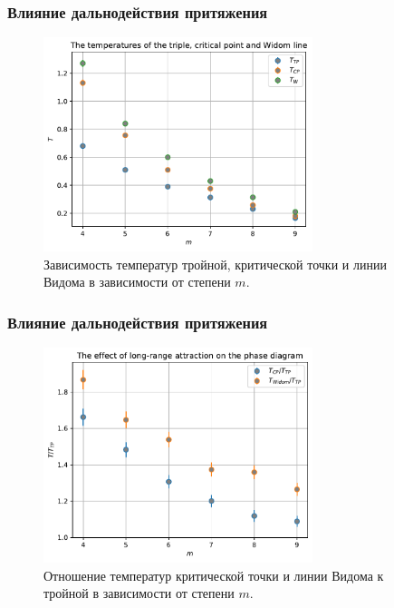 \documentclass[pdf,hyperref={unicode}]{beamer}
\begin{document}
\begin{frame}
\transdissolve[duration=0.2]
\frametitle{Влияние дальнодействия притяжения}

\begin{figure}[h]
\begin{center}
\includegraphics[width=0.7\textwidth]{temperatures_triple_critical_Widom}
\caption{ \small Зависимость температур тройной, критической точки и линии Видома в зависимости от степени $m$.}
\label{risTcpTtp}
\end{center}
\end{figure}

\end{frame}





\begin{frame}
\transdissolve[duration=0.2]
\frametitle{Влияние дальнодействия притяжения}

\begin{figure}[h]
\begin{center}
\includegraphics[width=0.7\textwidth]{effect_of_long-range_attraction}
\caption{\small Отношение температур критической точки и линии Видома к тройной в зависимости от степени $m$.}
\label{risTcpTtpWidoml}
\end{center}
\end{figure}

\end{frame}
\end{document}
